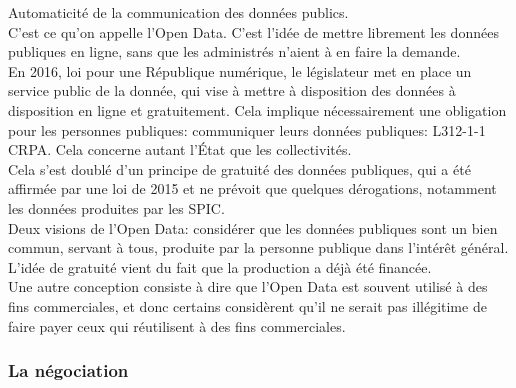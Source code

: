 \documentclass[10pt, a4paper, openany]{book}
\begin{document}
Automaticité de la communication des données publics. \\
C'est ce qu'on appelle l'Open Data. C'est l'idée de mettre librement les données publiques en ligne, sans que les administrés n'aient à en faire la demande. \\
En 2016, loi pour une République numérique, le législateur met en place un service public de la donnée, qui vise à mettre à disposition des données à disposition en ligne et gratuitement. Cela implique nécessairement une obligation pour les personnes publiques: communiquer leurs données publiques: L312-1-1 CRPA. Cela concerne autant l'État que les collectivités. \\
Cela s'est doublé d'un principe de gratuité des données publiques, qui a été affirmée par une loi de 2015 et ne prévoit que quelques dérogations, notamment les données produites par les SPIC. \\
Deux visions de l'Open Data: considérer que les données publiques sont un bien commun, servant à tous, produite par la personne publique dans l'intérêt général. L'idée de gratuité vient du fait que la production a déjà été financée. \\
Une autre conception consiste à dire que l'Open Data est souvent utilisé à des fins commerciales, et donc certains considèrent qu'il ne serait pas illégitime de faire payer ceux qui réutilisent à des fins commerciales. 

\subsubsection{La négociation}
\end{document}
